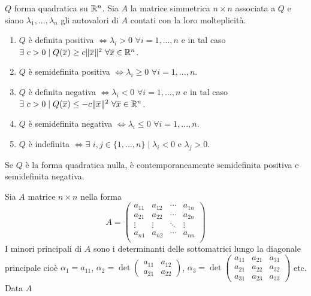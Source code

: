 \begin{proposition}
	$Q$ forma quadratica su $\mathbb{R}^n$. Sia $A$ la matrice simmetrica $n \times n$ associata a $Q$ e siano $\lambda_1,...,\lambda_n$ gli autovalori di $A$ contati con la loro molteplicità.
	\begin{enumerate}
		\item $Q$ è definita positiva $\Leftrightarrow \lambda_i >0 \,\, \forall i =1,...,n$ e in tal caso $\exists \,\, c >0 \mid Q(\overline{x})\geq c\|\overline{x}\|^2\,\, \forall \overline{x} \in \mathbb{R}^n$.
		\item $Q$ è semidefinita positiva $\Leftrightarrow \lambda_i \geq 0 \,\, \forall i=1,...,n$.
		\item $Q$ è definita negativa $\Leftrightarrow \lambda_i <0 \,\, \forall i =1,...,n$ e in tal caso $\exists \,\, c >0 \mid Q(\overline{x})\leq -c\|\overline{x}\|^2\,\, \forall \overline{x} \in \mathbb{R}^n$.
		\item $Q$ è semidefinita negativa $\Leftrightarrow \lambda_i \leq 0 \,\, \forall i=1,...,n$.
		\item $Q$ è indefinita $\Leftrightarrow \exists\,\, i,j \in \{1,...,n\} \mid \lambda_i <0$ e $\lambda_j>0$.
	\end{enumerate}
\end{proposition}


\begin{attbar}
	Se $Q$ è la forma quadratica nulla, è contemporaneamente semidefinita positiva e semidefinita negativa.
\end{attbar}

Sia $A$ matrice $n \times n$ nella forma
\begin{equation*}
	A= \begin{pmatrix}
		a_{11}&a_{12} &\cdots &a_{1n} \\
		a_{21}&a_{22} &\cdots &a_{2n} \\
		\vdots&\vdots &\ddots &\vdots \\
		a_{n1}&a_{n2} &\cdots &a_{nn} \\
	\end{pmatrix}
\end{equation*}
I minori principali di $A$ sono i determinanti delle sottomatrici lungo la diagonale principale cioè $\alpha_1=a_{11}$, $\alpha_2=\det\begin{pmatrix}
	a_{11}&a_{12} \\
	a_{21}&a_{22}
\end{pmatrix}$, $\alpha_3=\det\begin{pmatrix}
	a_{11}&a_{21}&a_{31} \\
	a_{21}&a_{22}&a_{32} \\
	a_{31}&a_{23}&a_{33} 
\end{pmatrix}$
etc.\\
Data $A$


